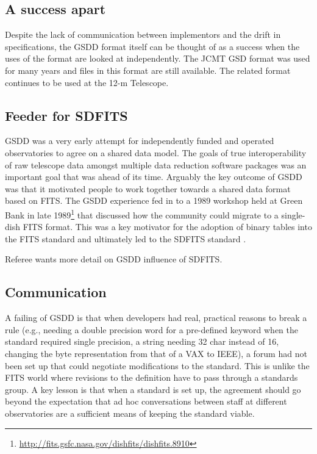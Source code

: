 \documentclass[final,authoryear,5p,times,twocolumn]{elsarticle}
\begin{document}
\subsection{A success apart}

Despite the lack of communication between implementors and the drift
in specifications, the GSDD format itself can be thought of as a
success when the uses of the format are looked at independently. The JCMT GSD
format was used for many years and files in this format are still
available. The related format continues to be used at the 12-m Telescope.


\subsection{Feeder for SDFITS}
\label{sec:sdfits}

GSDD was a very early attempt for independently funded and operated observatories to
agree on a shared data model. The goals of true interoperability of
raw telescope data amongst multiple data reduction software packages
was an important goal that was ahead of its time. Arguably the key
outcome of GSDD was that it motivated people to work together towards
a shared data format based on FITS. The GSDD experience fed in to a
1989 workshop held at Green Bank in late
1989\footnote{\url{http://fits.gsfc.nasa.gov/dishfits/dishfits.8910}}
that discussed how the community could migrate to a
single-dish FITS format. This was a key motivator for the adoption
of binary tables into the FITS standard \citep{1995A&AS..113..159C}
and ultimately led to the SDFITS standard \citep{2000ASPC..216..243G}.

{\color{red} Referee wants more detail on GSDD influence of SDFITS.}

\subsection{Communication}

A failing of GSDD is that when developers had real, practical reasons
to break a rule (e.g., needing a double precision word for a
pre-defined keyword when the standard required single precision, a
string needing 32 char instead of 16, changing the byte representation
from that of a VAX to IEEE), a forum had not been set up that could
negotiate modifications to the standard.  This is unlike the FITS
world where revisions to the definition have to pass through a
standards group.  A key lesson is that when a standard is
set up, the agreement should go beyond the expectation that ad hoc
conversations between staff at different observatories are a
sufficient means of keeping the standard viable.
\end{document}
